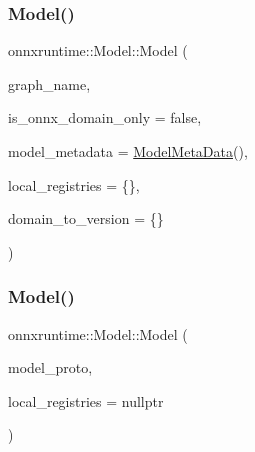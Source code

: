 \subsubsection{\texorpdfstring{Model()}{Model()}\hspace{0.1cm}{\footnotesize\ttfamily [1/3]}}
{\footnotesize\ttfamily onnxruntime\+::\+Model\+::\+Model (\begin{DoxyParamCaption}\item[{const std\+::string \&}]{graph\+\_\+name,  }\item[{bool}]{is\+\_\+onnx\+\_\+domain\+\_\+only = {\ttfamily false},  }\item[{const \mbox{\hyperlink{namespaceonnxruntime_a13519c21da77ccc594726b670276a266}{Model\+Meta\+Data}} \&}]{model\+\_\+metadata = {\ttfamily \mbox{\hyperlink{namespaceonnxruntime_a13519c21da77ccc594726b670276a266}{Model\+Meta\+Data}}()},  }\item[{const \mbox{\hyperlink{namespaceonnxruntime_a37a91305e7190e83fa9c66117a6a4746}{I\+Onnx\+Runtime\+Op\+Schema\+Registry\+List}}}]{local\+\_\+registries = {\ttfamily \{\}},  }\item[{const std\+::unordered\+\_\+map$<$ std\+::string, int $>$ \&}]{domain\+\_\+to\+\_\+version = {\ttfamily \{\}} }\end{DoxyParamCaption})\hspace{0.3cm}{\ttfamily [explicit]}}

\mbox{\label{classonnxruntime_1_1Model_a9c173259b1fbf481bd9dfdecbd34f7f0}} 
\subsubsection{\texorpdfstring{Model()}{Model()}\hspace{0.1cm}{\footnotesize\ttfamily [2/3]}}
{\footnotesize\ttfamily onnxruntime\+::\+Model\+::\+Model (\begin{DoxyParamCaption}\item[{const O\+N\+N\+X\+\_\+\+N\+A\+M\+E\+S\+P\+A\+C\+E\+::\+Model\+Proto \&}]{model\+\_\+proto,  }\item[{const \mbox{\hyperlink{namespaceonnxruntime_a37a91305e7190e83fa9c66117a6a4746}{I\+Onnx\+Runtime\+Op\+Schema\+Registry\+List}} $\ast$}]{local\+\_\+registries = {\ttfamily nullptr} }\end{DoxyParamCaption})\hspace{0.3cm}{\ttfamily [explicit]}}

